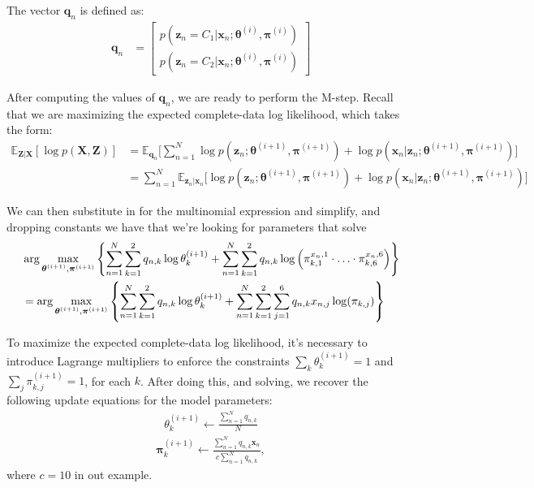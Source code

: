 The vector $\textbf{q}_n$  is defined as:
%
\begin{align}
  \label{E-for-multinomial}
    \textbf{q}_n &= \begin{bmatrix}
                p(\textbf{z}_n = C_1 | \textbf{x}_n; \boldsymbol{\theta}^{(i)}, \boldsymbol{\pi}^{(i)}) \\
                p(\textbf{z}_n = C_2 | \textbf{x}_n; \boldsymbol{\theta}^{(i)}, \boldsymbol{\pi}^{(i)}) 
            \end{bmatrix} 
\end{align}


After computing the values of $\textbf{q}_n$, we are ready to perform the M-step.
Recall that we are maximizing the expected complete-data log likelihood, which takes the form:
%
\begin{align} \label{M-for-multinomial}
    \mathbb{E}_{\textbf{Z}|\textbf{X}}[\log p(\textbf{X}, \textbf{Z})] &= \mathbb{E}_{\textbf{q}_n} \bigg[\sum_{n=1}^{N} \log p(\textbf{z}_n; \boldsymbol{\theta}^{(i+1)}, \boldsymbol{\pi}^{(i+1)}) + \log p(\textbf{x}_n | \textbf{z}_n; \boldsymbol{\theta}^{(i+1)}, \boldsymbol{\pi}^{(i+1)})\bigg] \\ 
                                                                       &= \sum_{n=1}^{N} \mathbb{E}_{\textbf{z}_n|\textbf{x}_n} \bigg[ \log p(\textbf{z}_n; \boldsymbol{\theta}^{(i+1)}, \boldsymbol{\pi}^{(i+1)}) + \log p(\textbf{x}_n | \textbf{z}_n; \boldsymbol{\theta}^{(i+1)}, \boldsymbol{\pi}^{(i+1)})\bigg]
\end{align}

We can then substitute in for the multinomial expression and simplify,
and dropping constants we have that we're looking for
parameters that solve
%
\begin{align}
&  \arg\max_{\boldsymbol{\theta}^{(i+1)}, \boldsymbol{\pi}^{(i+1)}}\left\{
                \sum_{n=1}^{N} \sum_{k=1}^{2} q_{n, k}  \log \theta_k^{(i+1)} +
  \sum_{n=1}^{N} \sum_{k=1}^{2}q_{n,k}\log\left(\pi_{k,1}^{x_n,1}\cdot\ldots\cdot\pi_{k,6}^{x_n,6}\right) \right\}
 \notag \\
  &=  \arg\max_{\boldsymbol{\theta}^{(i+1)}, \boldsymbol{\pi}^{(i+1)}}\left\{
                \sum_{n=1}^{N} \sum_{k=1}^{2} q_{n, k}  \log \theta_k^{(i+1)} +
    \sum_{n=1}^{N} \sum_{k=1}^{2}\sum_{j=1}^6 q_{n,k}x_{n,j}\log(\pi_{k,j})\right\}
    \label{eq:dpnew1}
\end{align}

To maximize the expected complete-data log likelihood, it's necessary to introduce Lagrange multipliers to enforce the constraints $\sum_{k} \theta_k^{(i+1)} = 1$ and $\sum_{j} \pi_{k, j}^{(i+1)} = 1$, for each $k$. After doing this,
and solving, we recover the following update equations for the model parameters:
%
\begin{align*}
    \theta_{k}^{(i+1)} \leftarrow \frac{\sum_{n=1}^{N} q_{n, k}}{N}
\end{align*}
\begin{align*}
    \boldsymbol{\pi}_{k}^{(i+1)} \leftarrow \frac{\sum_{n=1}^{N} q_{n, k} \textbf{x}_{n}}{c \sum_{n=1}^{N} q_{n, k} },
\end{align*}
%
where $c=10$ in out example.

